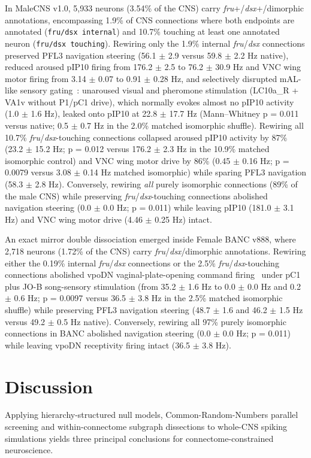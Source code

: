 \documentclass[11pt,a4paper]{article}
\begin{document}
In MaleCNS v1.0, 5,933 neurons (3.54\% of the CNS) carry \emph{fru}+/\emph{dsx}+/dimorphic annotations, encompassing 1.9\% of CNS connections where both endpoints are annotated (\texttt{fru/dsx internal}) and 10.7\% touching at least one annotated neuron (\texttt{fru/dsx touching}). Rewiring only the 1.9\% internal \emph{fru}/\emph{dsx} connections preserved PFL3 navigation steering (56.1 $\pm$ 2.9 versus 59.8 $\pm$ 2.2 Hz native), reduced aroused pIP10 firing from 176.2 $\pm$ 2.5 to 76.2 $\pm$ 30.9 Hz and VNC wing motor firing from 3.14 $\pm$ 0.07 to 0.91 $\pm$ 0.28 Hz, and selectively disrupted mAL-like sensory gating~\cite{clowney2015multimodal}: unaroused visual and pheromone stimulation (LC10a\_R + VA1v without P1/pC1 drive), which normally evokes almost no pIP10 activity (1.0 $\pm$ 1.6 Hz), leaked onto pIP10 at 22.8 $\pm$ 17.7 Hz (Mann--Whitney p = 0.011 versus native; 0.5 $\pm$ 0.7 Hz in the 2.0\% matched isomorphic shuffle). Rewiring all 10.7\% \emph{fru}/\emph{dsx}-touching connections collapsed aroused pIP10 activity by 87\% (23.2 $\pm$ 15.2 Hz; p = 0.012 versus 176.2 $\pm$ 2.3 Hz in the 10.9\% matched isomorphic control) and VNC wing motor drive by 86\% (0.45 $\pm$ 0.16 Hz; p = 0.0079 versus 3.08 $\pm$ 0.14 Hz matched isomorphic) while sparing PFL3 navigation (58.3 $\pm$ 2.8 Hz). Conversely, rewiring \emph{all} purely isomorphic connections (89\% of the male CNS) while preserving \emph{fru}/\emph{dsx}-touching connections abolished navigation steering (0.0 $\pm$ 0.0 Hz; p = 0.011) while leaving pIP10 (181.0 $\pm$ 3.1 Hz) and VNC wing motor drive (4.46 $\pm$ 0.25 Hz) intact.

An exact mirror double dissociation emerged inside Female BANC v888, where 2,718 neurons (1.72\% of the CNS) carry \emph{fru}/\emph{dsx}/dimorphic annotations. Rewiring either the 0.19\% internal \emph{fru}/\emph{dsx} connections or the 2.5\% \emph{fru}/\emph{dsx}-touching connections abolished vpoDN vaginal-plate-opening command firing~\cite{wang2021neural} under pC1 plus JO-B song-sensory stimulation (from 35.2 $\pm$ 1.6 Hz to 0.0 $\pm$ 0.0 Hz and 0.2 $\pm$ 0.6 Hz; p = 0.0097 versus 36.5 $\pm$ 3.8 Hz in the 2.5\% matched isomorphic shuffle) while preserving PFL3 navigation steering (48.7 $\pm$ 1.6 and 46.2 $\pm$ 1.5 Hz versus 49.2 $\pm$ 0.5 Hz native). Conversely, rewiring all 97\% purely isomorphic connections in BANC abolished navigation steering (0.0 $\pm$ 0.0 Hz; p = 0.011) while leaving vpoDN receptivity firing intact (36.5 $\pm$ 3.8 Hz).

\section{Discussion}
Applying hierarchy-structured null models, Common-Random-Numbers parallel screening and within-connectome subgraph dissections to whole-CNS spiking simulations yields three principal conclusions for connectome-constrained neuroscience.
\end{document}
